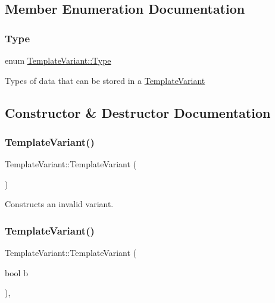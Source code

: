 \subsection{Member Enumeration Documentation}
\mbox{\label{class_template_variant_a4c0d322ba971480bfbd2a8f418eadc81}} 
\subsubsection{\texorpdfstring{Type}{Type}}
{\footnotesize\ttfamily enum \mbox{\hyperlink{class_template_variant_a4c0d322ba971480bfbd2a8f418eadc81}{Template\+Variant\+::\+Type}}}

Types of data that can be stored in a \mbox{\hyperlink{class_template_variant}{Template\+Variant}} 

\subsection{Constructor \& Destructor Documentation}
\mbox{\label{class_template_variant_a56e1f12ff7f2fc2f9c5d269495161201}} 
\subsubsection{\texorpdfstring{TemplateVariant()}{TemplateVariant()}\hspace{0.1cm}{\footnotesize\ttfamily [1/9]}}
{\footnotesize\ttfamily Template\+Variant\+::\+Template\+Variant (\begin{DoxyParamCaption}{ }\end{DoxyParamCaption})\hspace{0.3cm}{\ttfamily [inline]}}

Constructs an invalid variant. \mbox{\label{class_template_variant_ae41a75ce11e1187f0934f26bb78f8bd2}} 
\subsubsection{\texorpdfstring{TemplateVariant()}{TemplateVariant()}\hspace{0.1cm}{\footnotesize\ttfamily [2/9]}}
{\footnotesize\ttfamily Template\+Variant\+::\+Template\+Variant (\begin{DoxyParamCaption}\item[{bool}]{b }\end{DoxyParamCaption})\hspace{0.3cm}{\ttfamily [inline]}, {\ttfamily [explicit]}}

